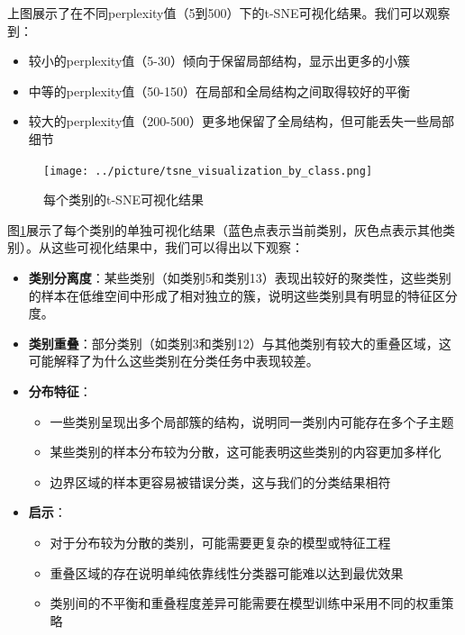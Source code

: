 \documentclass[11pt,a4paper]{article}
\begin{document}
上图展示了在不同perplexity值（5到500）下的t-SNE可视化结果。我们可以观察到：
\begin{itemize}
    \item 较小的perplexity值（5-30）倾向于保留局部结构，显示出更多的小簇
    \item 中等的perplexity值（50-150）在局部和全局结构之间取得较好的平衡
    \item 较大的perplexity值（200-500）更多地保留了全局结构，但可能丢失一些局部细节
\end{itemize}

\begin{figure}[htbp]
    \centering
    \texttt{[image: ../picture/tsne\_visualization\_by\_class.png]}
    \caption{每个类别的t-SNE可视化结果}
    \label{fig:tsne_by_class}
\end{figure}

图\ref{fig:tsne_by_class}展示了每个类别的单独可视化结果（蓝色点表示当前类别，灰色点表示其他类别）。从这些可视化结果中，我们可以得出以下观察：

\begin{itemize}
    \item \textbf{类别分离度}：某些类别（如类别5和类别13）表现出较好的聚类性，这些类别的样本在低维空间中形成了相对独立的簇，说明这些类别具有明显的特征区分度。
    
    \item \textbf{类别重叠}：部分类别（如类别3和类别12）与其他类别有较大的重叠区域，这可能解释了为什么这些类别在分类任务中表现较差。
    
    \item \textbf{分布特征}：
    \begin{itemize}
        \item 一些类别呈现出多个局部簇的结构，说明同一类别内可能存在多个子主题
        \item 某些类别的样本分布较为分散，这可能表明这些类别的内容更加多样化
        \item 边界区域的样本更容易被错误分类，这与我们的分类结果相符
    \end{itemize}
    
    \item \textbf{启示}：
    \begin{itemize}
        \item 对于分布较为分散的类别，可能需要更复杂的模型或特征工程
        \item 重叠区域的存在说明单纯依靠线性分类器可能难以达到最优效果
        \item 类别间的不平衡和重叠程度差异可能需要在模型训练中采用不同的权重策略
    \end{itemize}
\end{itemize}
\end{document}
